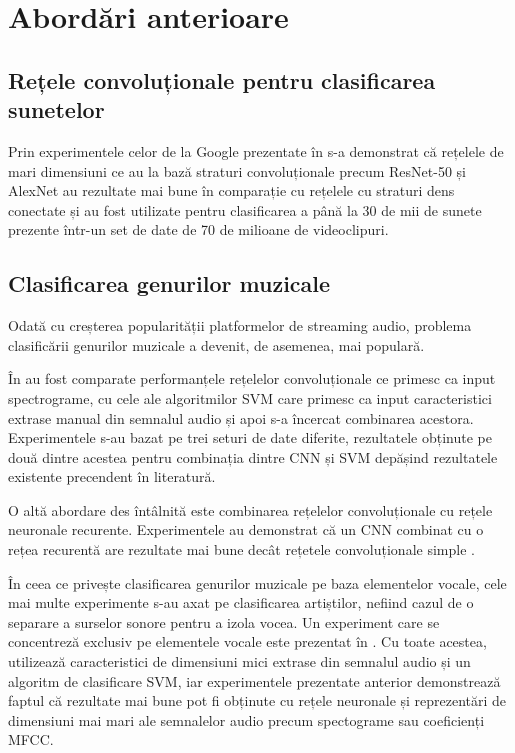 \chapter{Abordări anterioare}
\section{Rețele convoluționale pentru clasificarea sunetelor}
Prin experimentele celor de la Google prezentate în \cite{large} s-a demonstrat că rețelele de mari dimensiuni
ce au la bază straturi convoluționale precum ResNet-50 \cite{resnet} și AlexNet \cite{alexnet} au rezultate mai bune în comparație 
cu rețelele cu straturi dens conectate și au fost utilizate pentru clasificarea a până la 30 de mii de 
sunete prezente într-un set de date de 70 de milioane de videoclipuri.
\section{Clasificarea genurilor muzicale}
Odată cu creșterea popularității platformelor de streaming audio, problema clasificării genurilor muzicale a devenit, 
de asemenea, mai populară. 

În \cite{mgcrelated} au fost comparate performanțele rețelelor convoluționale ce primesc ca input 
spectrograme, cu cele ale algoritmilor SVM care primesc ca input caracteristici extrase manual din semnalul audio și apoi s-a încercat 
combinarea acestora.
Experimentele s-au bazat pe trei seturi de date diferite, rezultatele obținute pe două dintre acestea pentru combinația dintre CNN și SVM
depășind rezultatele existente precendent în literatură.

O altă abordare des întâlnită este combinarea rețelelor convoluționale cu rețele neuronale recurente. Experimentele au demonstrat că un CNN 
combinat cu o rețea recurentă are rezultate mai bune decât rețetele convoluționale simple \cite{resut1} \cite{resut2}.

În ceea ce privește clasificarea genurilor muzicale pe baza elementelor vocale, cele mai multe experimente s-au axat pe clasificarea artiștilor, 
nefiind cazul de o separare a surselor sonore  pentru a izola vocea. Un experiment care se concentreză exclusiv pe elementele vocale este 
prezentat în \cite{vocal}. Cu toate acestea, utilizează caracteristici de dimensiuni mici extrase din semnalul audio și un algoritm de 
clasificare SVM, iar experimentele prezentate anterior demonstrează faptul că rezultate mai bune pot fi obținute cu rețele neuronale și 
reprezentări de dimensiuni mai mari ale semnalelor audio precum spectograme sau coeficienți MFCC.